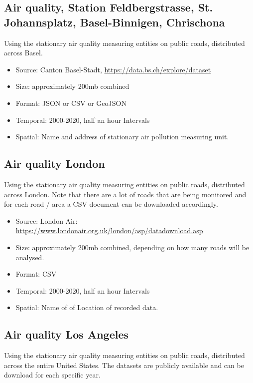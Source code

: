 \documentclass{article}
\begin{document}
\subsection{Air quality, Station Feldbergstrasse, St. Johannsplatz, Basel-Binnigen, Chrischona}

Using the stationary air quality measuring entities on public roads, distributed across Basel.

\begin{itemize}
	\item Source: Canton Basel-Stadt,  \url{https://data.bs.ch/explore/dataset}
	\item Size: approximately 200mb combined
	\item Format: JSON or CSV or GeoJSON
	\item Temporal: 2000-2020, half an hour Intervals
	\item Spatial: Name and address of stationary air pollution measuring unit.
\end{itemize}


\subsection{Air quality London}

Using the stationary air quality measuring entities on public roads, distributed across London. Note that there are a lot of roads that are being monitored and for each road / area a CSV document can be downloaded accordingly.

\begin{itemize}
	\item Source: London Air: \url{https://www.londonair.org.uk/london/asp/datadownload.asp}
	\item Size: approximately 200mb combined, depending on how many roads will be analysed.
	\item Format: CSV
	\item Temporal: 2000-2020, half an hour Intervals
	\item Spatial: Name of of Location of recorded data.
\end{itemize}

\subsection{Air quality Los Angeles}

Using the stationary air quality measuring entities on public roads, distributed across the entire United States.  The datasets are publicly available and can be download for each specific year.
\end{document}
